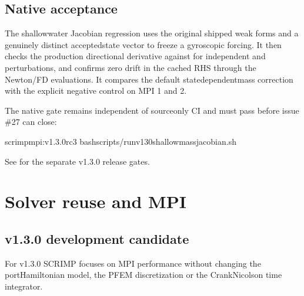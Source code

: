 \documentclass[letterpaper,10pt,english]{sphinxmanual}
\begin{document}
\subsection{Native acceptance}
\label{\detokenize{explicit_bricks:native-acceptance}}
\sphinxAtStartPar
The shallow\sphinxhyphen{}water Jacobian regression uses the original
shipped weak forms and a genuinely distinct accepted\sphinxhyphen{}state
vector to freeze a  gyroscopic forcing. It then
checks the production  directional derivative
against  for independent  and 
perturbations, and confirms zero drift in the cached RHS
through the Newton/FD evaluations. It compares the default
state\sphinxhyphen{}dependent\sphinxhyphen{}mass correction with the explicit
 negative control on MPI 1 and 2.

\sphinxAtStartPar
The native gate remains independent of source\sphinxhyphen{}only CI and
must pass before issue \#27 can close:

\begin{sphinxVerbatim}[commandchars=\\\{\}]
scrimp\PYGZhy{}mpi:v1.3.0\PYGZhy{}rc3
bashscripts/run\PYGZhy{}v130\PYGZhy{}shallow\PYGZhy{}mass\PYGZhy{}jacobian.sh
\end{sphinxVerbatim}

\sphinxAtStartPar
See  for the
separate v1.3.0 release gates.

\sphinxstepscope


\section{Solver reuse and MPI}
\label{\detokenize{performance:solver-reuse-and-mpi}}\label{\detokenize{performance::doc}}

\subsection{v1.3.0 development candidate}
\label{\detokenize{performance:v1-3-0-development-candidate}}
\sphinxAtStartPar
For v1.3.0 SCRIMP focuses on MPI performance without changing the
port\sphinxhyphen{}Hamiltonian model, the PFEM discretization or the Crank\textendash{}Nicolson
time integrator.
\end{document}
